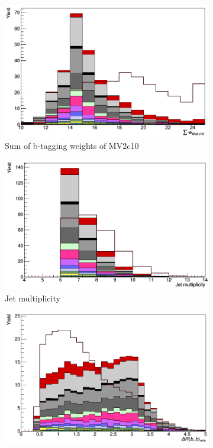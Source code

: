 \begin{figure}[H]
\begin{subfigure}{.5\textwidth}
  \centering
  \includegraphics[width=.99\linewidth]{figs/features/MV2c10}
  \caption{Sum of b-tagging weights of MV2c10}
  \label{fig:MV2c10}
\end{subfigure}%
\begin{subfigure}{.5\textwidth}
  \centering
  \includegraphics[width=.99\linewidth]{figs//features/nJets}
  \caption{Jet multiplicity}
  \label{fig:nJets}
\end{subfigure}
\begin{subfigure}{.5\textwidth}
  \centering
  \includegraphics[width=.99\linewidth]{figs/features/dRbbmin}

\end{subfigure}
\end{figure}
